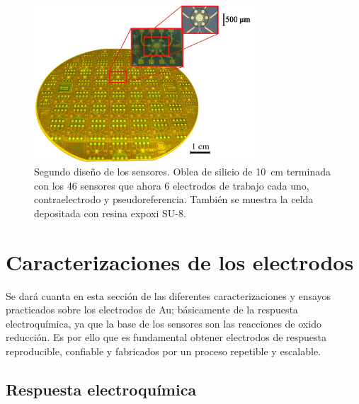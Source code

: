 					  \begin{figure}[ht!]
					  \begin{center}
					  \includegraphics[width=0.75\textwidth]{Imagenes/ObleaV2.jpg}
					  \caption[Electrodos, segunda versión]{Segundo diseño de los sensores. Oblea de silicio de \SI{10}{cm} terminada con los 46 sensores que ahora 6 electrodos de trabajo cada uno, contraelectrodo y pseudoreferencia. También se muestra la celda depositada con resina expoxi SU-8.}
					  \label{fig:ObleaV2}
					  \end{center}
					  \end{figure} 	
		
\section{Caracterizaciones de los electrodos}

		Se dará cuanta en esta sección de las diferentes caracterizaciones y ensayos practicados sobre los electrodos de Au; básicamente de la respuesta electroquímica, ya que la base de los sensores son las reacciones de oxido reducción. Es por ello que es fundamental obtener electrodos de respuesta reproducible, confiable y fabricados por un proceso repetible y escalable. 

	\subsection{Respuesta electroquímica}\label{sec:respuesta_sondas_au}
			 		
